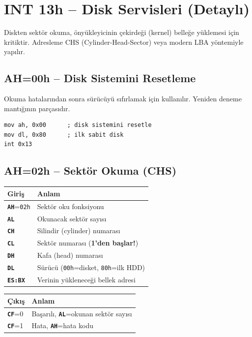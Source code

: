 \documentclass[11pt,a4paper]{article}
\newcommand{\reg}[1]{\texttt{\color{anaMavi}\textbf{#1}}}
\newcommand{\hx}[1]{\texttt{\color{turuncu}#1}}
\begin{document}
\section{INT 13h -- Disk Servisleri (Detaylı)}

Diskten sektör okuma, önyükleyicinin çekirdeği (kernel) belleğe yüklemesi için
kritiktir. Adresleme CHS (Cylinder-Head-Sector) veya modern LBA yöntemiyle
yapılır.

\subsection{AH=00h -- Disk Sistemini Resetleme}

Okuma hatalarından sonra sürücüyü sıfırlamak için kullanılır. Yeniden deneme
mantığının parçasıdır.

\begin{lstlisting}
mov ah, 0x00      ; disk sistemini resetle
mov dl, 0x80      ; ilk sabit disk
int 0x13
\end{lstlisting}

\subsection{AH=02h -- Sektör Okuma (CHS)}

\begin{center}
\begin{tabularx}{\textwidth}{@{}l >{\raggedright\arraybackslash}X@{}}
\toprule
\rowcolor{acikMavi}\color{anaMavi}\textbf{Giriş} & \color{anaMavi}\textbf{Anlam} \\
\midrule
\reg{AH}=\hx{02h} & Sektör oku fonksiyonu \\
\reg{AL} & Okunacak sektör sayısı \\
\reg{CH} & Silindir (cylinder) numarası \\
\reg{CL} & Sektör numarası (\textbf{1'den başlar!}) \\
\reg{DH} & Kafa (head) numarası \\
\reg{DL} & Sürücü (\hx{00h}=disket, \hx{80h}=ilk HDD) \\
\reg{ES:BX} & Verinin yükleneceği bellek adresi \\
\bottomrule
\end{tabularx}
\end{center}

\begin{center}
\begin{tabularx}{\textwidth}{@{}l >{\raggedright\arraybackslash}X@{}}
\toprule
\rowcolor{acikMavi}\color{anaMavi}\textbf{Çıkış} & \color{anaMavi}\textbf{Anlam} \\
\midrule
\reg{CF}=0 & Başarılı, \reg{AL}=okunan sektör sayısı \\
\reg{CF}=1 & Hata, \reg{AH}=hata kodu \\
\bottomrule
\end{tabularx}
\end{center}
\end{document}
